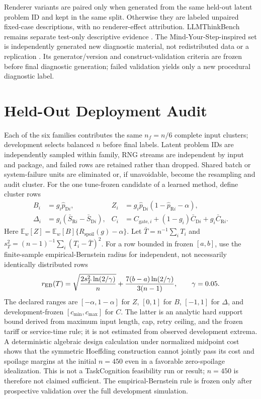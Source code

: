 \documentclass{article}
\newcommand{\D}{\ensuremath{\mathrm{D}}}
\newcommand{\Rpol}{\ensuremath{\mathrm{R}}}
\newcommand{\1}{\mathbb{I}}
\newcommand{\Ew}{\mathbb{E}_{w}}
\newcommand{\Rspoil}{R_{\mathrm{spoil}}}
\begin{document}
Renderer variants are paired only when generated from the same held-out latent problem ID and kept in the same split. Otherwise they are labeled unpaired fixed-case descriptions, with no renderer-effect attribution. LLMThinkBench remains separate test-only descriptive evidence \citep{srivastava-etal-2026-llms,llmthinkbenchsoftware2026}. The Mind-Your-Step-inspired set is independently generated new diagnostic material, not redistributed data or a replication \citep{pmlr-v267-liu25t,mindyourstepsoftware2025,taskcognitiondiagnosticplan2026}. Its generator/version and construct-validation criteria are frozen before final diagnostic generation; failed validation yields only a new procedural diagnostic label.

\section{Held-Out Deployment Audit}
Each of the six families contributes the same $n_f=n/6$ complete input clusters; development selects balanced $n$ before final labels. Latent problem IDs are independently sampled within family, RNG streams are independent by input and package, and failed rows are retained rather than dropped. Shared batch or system-failure units are eliminated or, if unavoidable, become the resampling and audit cluster. For the one tune-frozen candidate of a learned method, define cluster rows
\begin{align}
 B_i&=g_i\widehat p_{\D i}, &
 Z_i&=g_i\widehat p_{\D i}(1-\widehat p_{\Rpol i}-\alpha),\\
 \Delta_i&=g_i(\bar S_{\Rpol i}-\bar S_{\D i}), &
 C_i&=C_{\mathrm{gate},i}+(1-g_i)\bar C_{\D i}+g_i\bar C_{\Rpol i}.
 \label{eq:audit-rows}
\end{align}
Here $\Ew[Z]=\Ew[B]\{\Rspoil(g)-\alpha\}$. Let $\bar T=n^{-1}\sum_iT_i$ and $s_T^2=(n-1)^{-1}\sum_i(T_i-\bar T)^2$. For a row bounded in frozen $[a,b]$, use the finite-sample empirical-Bernstein radius for independent, not necessarily identically distributed rows \citep{maurer2009empirical}
\begin{equation}
 r_{\rm EB}(T)=\sqrt{\frac{2s_T^2\ln(2/\gamma)}{n}}
 +\frac{7(b-a)\ln(2/\gamma)}{3(n-1)},\qquad \gamma=0.05.
 \label{eq:eb}
\end{equation}
The declared ranges are $[-\alpha,1-\alpha]$ for $Z$, $[0,1]$ for $B$, $[-1,1]$ for $\Delta$, and development-frozen $[c_{\min},c_{\max}]$ for $C$. The latter is an analytic hard support bound derived from maximum input length, cap, retry ceiling, and the frozen tariff or service-time rule; it is not estimated from observed development extrema. A deterministic algebraic design calculation under normalized midpoint cost shows that the symmetric Hoeffding construction \citep{hoeffding1963probability} cannot jointly pass its cost and spoilage margins at the initial $n=450$ even in a favorable zero-spoilage idealization. This is not a TaskCognition feasibility run or result; $n=450$ is therefore not claimed sufficient. The empirical-Bernstein rule is frozen only after prospective validation over the full development simulation.
\end{document}
